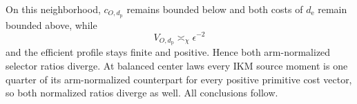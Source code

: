 On this neighborhood, \(c_{O,d_{\mathrm p}}\) remains bounded below and both costs of \(d_{\mathrm e}\) remain bounded above, while
\[
 V_{O,d_{\mathrm p}}\asymp_\chi\epsilon^{-2}
\]
and the efficient profile stays finite and positive.  Hence both arm-normalized selector ratios diverge.  At balanced center laws every IKM source moment is one quarter of its arm-normalized counterpart for every positive primitive cost vector, so both normalized ratios diverge as well.  All conclusions follow.